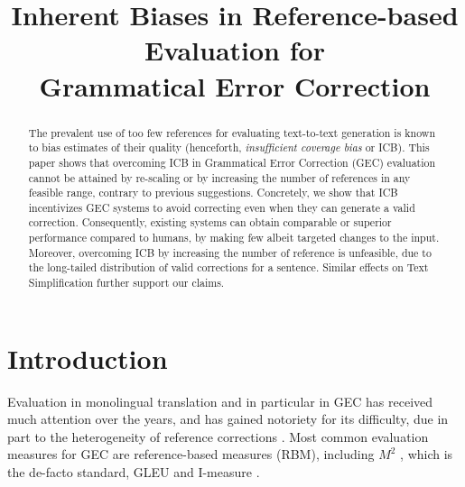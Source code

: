 \documentclass[a4paper, 11pt]{article}
\begin{document}
\title{Inherent Biases in Reference-based Evaluation for \\ Grammatical Error Correction}
\maketitle

	\begin{abstract}
		The prevalent use of too few references for evaluating text-to-text
		generation is known to bias estimates of their quality (henceforth, {\it insufficient
		  coverage bias} or ICB). This paper shows that overcoming ICB in
		Grammatical Error Correction (GEC) evaluation cannot be attained by
		re-scaling or by increasing the number of references in any feasible
		range, contrary to previous suggestions.
		Concretely, we show that ICB incentivizes GEC systems to avoid
    correcting even when they can generate a valid correction. 
    Consequently, existing systems can obtain comparable or
		superior performance compared to humans, by making few albeit targeted 
		changes to the input.
		Moreover, overcoming ICB by increasing the number of reference is unfeasible, 
		due to the long-tailed distribution of valid corrections for a sentence.
		Similar effects on Text Simplification further support our claims.
	\end{abstract}
	
	\section{Introduction}
	
	Evaluation in monolingual translation \cite{xu2015problems,inderjeet2009summarization} and
	in particular in GEC
	\cite{tetreault2008native,madnani2011they,felice2015towards,bryant2015far,napoles2015ground}
	has received much attention over the years, and has gained notoriety for its difficulty,
	due in part to the heterogeneity of reference corrections \cite{chodorow2012problems}.
	Most common evaluation measures for GEC are reference-based measures (RBM), including
  $M^2$ \cite{dahlmeier2012better}, which is the de-facto standard, GLEU \cite{napoles2015ground} and I-measure \cite{felice2015towards}.
	
\end{document}
